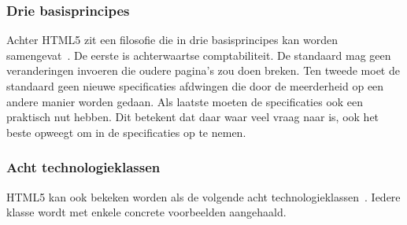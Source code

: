 \subsubsection{Drie basisprincipes}
Achter HTML5 zit een filosofie die in drie basisprincipes kan worden samengevat~\cite{MacDonald2011}.  De eerste is achterwaartse comptabiliteit. De standaard mag geen veranderingen invoeren die oudere pagina's zou doen breken. Ten tweede moet de standaard geen nieuwe specificaties afdwingen die door de meerderheid op een andere manier worden gedaan. Als laatste moeten de specificaties ook een praktisch nut hebben. Dit betekent dat daar waar veel vraag naar is, ook het beste opweegt om in de specificaties op te nemen.

\subsubsection{Acht technologieklassen}
HTML5 kan ook bekeken worden als de volgende acht technologieklassen~\cite{W3C2012}. Iedere klasse wordt met enkele concrete voorbeelden aangehaald.

